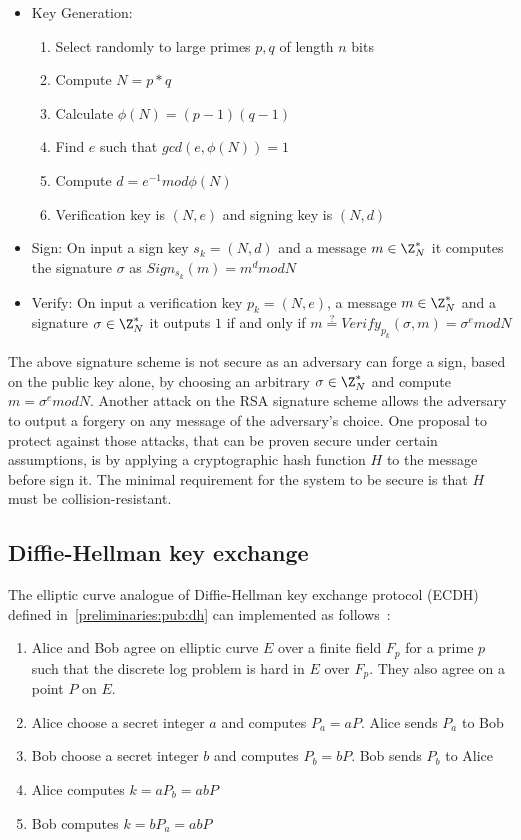 \begin{itemize}
  \item Key Generation:
    \begin{enumerate}
      \item Select randomly to large primes $p, q$ of length $n$ bits
      \item Compute $N = p*q$
      \item Calculate $\phi(N) = (p - 1)(q - 1)$
      \item Find $e$ such that $gcd(e, \phi(N)) = 1$
      \item Compute $d = e^{-1} mod\phi(N)$
      \item Verification key is $(N, e)$ and signing key is $(N, d)$
    \end{enumerate}
  \item Sign: On input a sign key $s_k = (N, d)$ and a message $m \in \Z^{*}_{N}$ it computes the signature $\sigma$ as $ Sign_{s_k}(m) = m^{d}modN$
  \item Verify: On input a verification key $p_k = (N, e)$, a message $m \in \Z^{*}_{N}$ and a signature $\sigma \in \Z^{*}_{N}$ it outputs $1$ if and only if $m \stackrel{?}{=} Verify_{p_k}(\sigma, m) = \sigma^{e}modN$
\end{itemize}

The above signature scheme is not secure as an adversary can forge a sign, based on the public key alone, by choosing an arbitrary $\sigma \in \Z^{*}_{N}$ and compute $m = \sigma^{e}modN$. Another attack on the RSA signature scheme allows the adversary to output a forgery on any message of the adversary's choice. One proposal to protect against those attacks, that can be proven secure under certain assumptions, is by applying a cryptographic hash function $H$ to the message before sign it. The minimal requirement for the system to be secure is that $H$ must be collision-resistant.

\subsection{Diffie-Hellman key exchange}
\label{preliminaries:el_curves:dh}

The elliptic curve analogue of Diffie-Hellman key exchange protocol (ECDH) defined in~\ref{preliminaries:pub:dh} can implemented as follows~\cite{elliptic_curves}:

\begin{enumerate}
  \item Alice and Bob agree on elliptic curve $E$ over a finite field $F_p$ for a prime $p$ such that the discrete log problem is hard in $E$ over $F_p$. They also agree on a point $P$ on $E$.
  \item Alice choose a secret integer $a$ and computes $P_a = aP$. Alice sends $P_a$ to Bob
  \item Bob choose a secret integer $b$ and computes $P_b = bP$. Bob sends $P_b$ to Alice
  \item Alice computes $k = aP_b = abP$
  \item Bob computes $k = bP_a = abP$
\end{enumerate}

